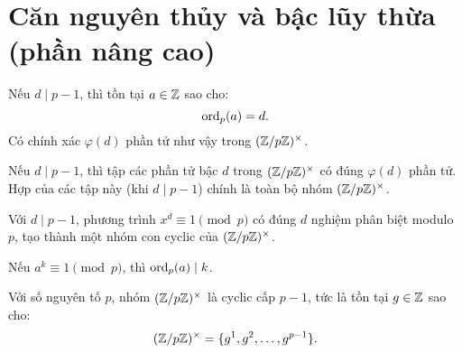 \documentclass[../imo-training-open-book.tex]{subfiles}
\begin{document}
\newpage

\section{Căn nguyên thủy và bậc lũy thừa (phần nâng cao)}

\begin{lemma}
    \label{lemma:exists-order-d}
    Nếu \( d \mid p - 1 \), thì tồn tại \( a \in \mathbb Z \) sao cho:
    \[
        \operatorname{ord}_p(a) = d.
    \]
    Có chính xác \( \varphi(d) \) phần tử như vậy trong \( (\mathbb Z/p\mathbb Z)^\times \).
\end{lemma}

\vspace{1em}

\begin{theorem}
    \label{theorem:residue-class-order-d}
    Nếu \( d \mid p - 1 \), thì tập các phần tử bậc \( d \) trong \( (\mathbb Z/p\mathbb Z)^\times \) có đúng \( \varphi(d) \) phần tử. Hợp của các tập này (khi \( d \mid p - 1 \)) chính là toàn bộ nhóm \( (\mathbb Z/p\mathbb Z)^\times \).
\end{theorem}

\vspace{1em}

\begin{theorem}
    \label{theorem:roots-of-unity-mod-p}
    Với \( d \mid p - 1 \), phương trình \( x^d \equiv 1 \pmod{p} \) có đúng \( d \) nghiệm phân biệt modulo \( p \), tạo thành một nhóm con cyclic của \( (\mathbb Z/p\mathbb Z)^\times \).
\end{theorem}

\vspace{1em}

\begin{lemma}
    \label{lemma:order-divides-implies-root}
    Nếu \( a^k \equiv 1 \pmod{p} \), thì \( \operatorname{ord}_p(a) \mid k \).
\end{lemma}

\vspace{1em}

\begin{theorem}
    \label{theorem:multiplicative-group-structure}
    Với số nguyên tố \( p \), nhóm \( (\mathbb Z/p\mathbb Z)^\times \) là cyclic cấp \( p - 1 \), tức là tồn tại \( g \in \mathbb Z \) sao cho:
    \[
        (\mathbb Z/p\mathbb Z)^\times = \{ g^1, g^2, \ldots, g^{p-1} \}.
    \]
\end{theorem}
\end{document}
